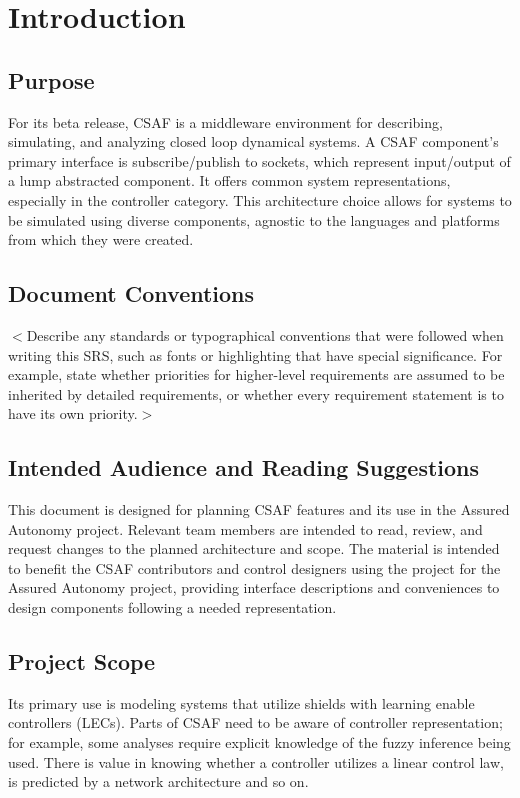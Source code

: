 \chapter{Introduction}

\section{Purpose}
For its beta release, CSAF is a middleware environment for describing, simulating, and analyzing closed loop dynamical systems. A CSAF component's primary interface is subscribe/publish to sockets, which represent input/output of a lump abstracted component. It offers common system representations, especially in the controller category. This architecture choice allows for systems to be simulated using diverse components, agnostic to the languages and platforms from which they were created.


\section{Document Conventions}
$<$Describe any standards or typographical conventions that were followed when 
writing this SRS, such as fonts or highlighting that have special significance.  
For example, state whether priorities  for higher-level requirements are assumed 
to be inherited by detailed requirements, or whether every requirement statement 
is to have its own priority.$>$

\section{Intended Audience and Reading Suggestions}

This document is designed for planning CSAF features and its use in the Assured Autonomy project. Relevant team members are intended to read, review, and request changes to the planned architecture and scope. The material is intended to benefit the CSAF contributors and control designers using the project for the Assured Autonomy project, providing interface descriptions and conveniences to design components following a needed representation. \\

\section{Project Scope}
Its primary use is modeling systems that utilize shields with learning enable controllers (LECs). Parts of CSAF need to be aware of controller representation; for example, some analyses require explicit knowledge of the fuzzy inference being used. There is value in knowing whether a controller utilizes a linear control law, is predicted by a network architecture and so on.\\

